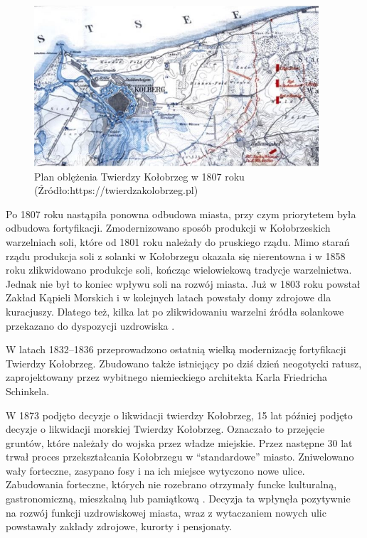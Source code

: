 \documentclass{amuthesis}
\begin{document}
\begin{figure}[t]

{\centering \includegraphics[width=400px]{figures/Kolobrzeg_napoleon} 

}

\caption{Plan oblężenia Twierdzy Kołobrzeg w 1807 roku (Źródło:https://twierdzakolobrzeg.pl)}\label{fig:ryc3}
\end{figure}

Po 1807 roku nastąpiła ponowna odbudowa miasta, przy czym priorytetem była odbudowa fortyfikacji.
Zmodernizowano sposób produkcji w Kołobrzeskich warzelniach soli, które od 1801 roku należały do pruskiego rządu.
Mimo starań rządu produkcja soli z solanki w Kołobrzegu okazała się nierentowna i w 1858 roku zlikwidowano produkcje soli, kończąc wielowiekową tradycje warzelnictwa.
Jednak nie był to koniec wpływu soli na rozwój miasta.
Już w 1803 roku powstał Zakład Kąpieli Morskich i w kolejnych latach powstały domy zdrojowe dla kuracjuszy.
Dlatego też, kilka lat po zlikwidowaniu warzelni źródła solankowe przekazano do dyspozycji uzdrowiska \autocite{heider}.

W latach 1832--1836 przeprowadzono ostatnią wielką modernizację fortyfikacji Twierdzy Kołobrzeg.
Zbudowano także istniejący po dziś dzień neogotycki ratusz, zaprojektowany przez wybitnego niemieckiego architekta Karla Friedricha Schinkela.

W 1873 podjęto decyzje o likwidacji twierdzy Kołobrzeg, 15 lat później podjęto decyzje o likwidacji morskiej Twierdzy Kołobrzeg.
Oznaczało to przejęcie gruntów, które należały do wojska przez władze miejskie.
Przez następne 30 lat trwał proces przekształcania Kołobrzegu w ``standardowe'' miasto. Zniwelowano wały forteczne, zasypano fosy i na ich miejsce wytyczono nowe ulice.
Zabudowania forteczne, których nie rozebrano otrzymały funcke kulturalną, gastronomiczną, mieszkalną lub pamiątkową \autocite{historia_kołobrzeg}.
Decyzja ta wpłynęła pozytywnie na rozwój funkcji uzdrowiskowej miasta, wraz z wytaczaniem nowych ulic powstawały zakłady zdrojowe, kurorty i pensjonaty.
\end{document}
